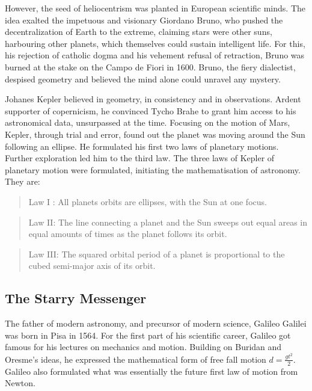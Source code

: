 However, the seed of heliocentrism was planted in European scientific minds. The idea exalted the impetuous and visionary Giordano Bruno, who pushed the decentralization of Earth to the extreme, claiming stars were other suns, harbouring other planets, which themselves could sustain intelligent life. For this, his rejection of catholic dogma and his vehement refusal of retraction, Bruno was burned at the stake on the Campo de Fiori in 1600. Bruno, the fiery dialectist, despised geometry and believed the mind alone could unravel any mystery. 

Johanes Kepler believed in geometry, in consistency and in observations. Ardent supporter of copernicism, he convinced Tycho Brahe to grant him access to his astronomical data, unsurpassed at the time. Focusing on the motion of Mars, Kepler, through trial and error, found out the planet was moving around the Sun following an ellipse. He formulated his first two laws of planetary motions. Further exploration led him to the third law. The three laws of Kepler of planetary motion were formulated, initiating the mathematisation of astronomy. They are:

\begin{quote}
Law I : All planets orbits are ellipses, with the Sun at one focus.
\end{quote}

\begin{quote}
Law II: The line connecting a planet and the Sun sweeps out equal areas in equal amounts of times as the planet follows its orbit.
\end{quote}
 
 \begin{quote}
 Law III: The squared orbital period of a planet is proportional to the cubed semi-major axis of its orbit.
 \end{quote}


\subsection*{The Starry Messenger}


The father of modern astronomy, and precursor of modern science, Galileo Galilei was born in Pisa in 1564. For the first part of his scientific career, Galileo got famous for his lectures on mechanics and motion. Building on Buridan and Oresme's ideas, he expressed the mathematical form of free fall motion $ d = \frac{gt^2}{2}$. Galileo also formulated what was essentially the future first law of motion from Newton.

